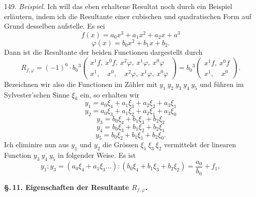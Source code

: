 \documentclass[11pt]{article}
\providecommand{\weberpage}[1]{}
\providecommand{\weq}[2]{\begin{equation}\tag{#1}#2\end{equation}}
\begin{document}
149. \textit{Beispiel.} Ich will das eben erhaltene Resultat noch
durch ein Beispiel erl\"autern, indem ich die Resultante einer
cubischen und quadratischen Form auf Grund desselben aufstelle. Es sei
\[
f(x) = a_0x^3 + a_1x^2 + a_2x + a^3
\]
\[
\varphi(x) = b_0x^2 + b_1x + b_2.
\]
Dann ist die Resultante der beiden Functionen dargestellt durch
\[
R_{f,\varphi} = (-1)^6\cdot b_0{}^3\left(\begin{array}{l}
x^1f,\ x^0f,\ x^2\varphi,\ x^1\varphi,\ x^0\varphi\\[2pt]
x^1,\quad x^0,\quad x^2\varphi,\ x^1\varphi,\ x^0\varphi
\end{array}\right)
= b_0{}^3\left(\begin{array}{l}
x^1f,\ x^0f\\[2pt]
x^1,\quad x^0
\end{array}\right).
\]
Bezeichnen wir also die Functionen im Z\"ahler mit
$y_1\ y_2\ y_3\ y_4\ y_5$ und f\"uhren im Sylvester'schen Sinne $\xi_k$
ein, so erhalten wir
\[
y_1 = a_0\xi_4 + a_1\xi_3 + a_2\xi_2 + a_3\xi_1
\]
\[
y_2 = a_0\xi_3 + a_1\xi_2 + a_2\xi_1 + a_3\xi_0
\]
\[
y_3 = b_0\xi_4 + b_1\xi_3 + b_2\xi_2
\]
\[
y_4 = b_0\xi_3 + b_1\xi_2 + b_2\xi_1
\]
\[
y_5 = b_0\xi_2 + b_1\xi_1 + b_2\xi_0.
\]
Ich eliminire nun aus $y_1$ und $y_2$ die Gr\"ossen $\xi_1\ \xi_3\ \xi_2$
vermittelst der linearen Function $y_3\ y_4\ y_5$ in folgender Weise.
Es ist
\weq{1}{y_1 : y_3 = (a_0\xi_4 + a_1\xi_3\ldots) : (b_0\xi_4 + b_1\xi_3 + b_2\xi_2) = \frac{a_0}{b_0} + f_1,}


\weberpage{155}
\textbf{\S.\,11. Eigenschaften der Resultante $R_{f,\varphi}$.}
\end{document}
